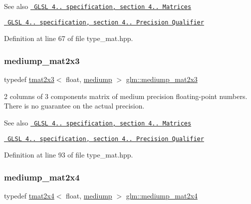 \begin{DoxySeeAlso}{See also}
\href{http://www.opengl.org/registry/doc/GLSLangSpec.4.20.8.pdf}{\texttt{ G\+L\+SL 4.. specification, section 4.. Matrices}} 

\href{http://www.opengl.org/registry/doc/GLSLangSpec.4.20.8.pdf}{\texttt{ G\+L\+SL 4.. specification, section 4.. Precision Qualifier}} 
\end{DoxySeeAlso}


Definition at line 67 of file type\+\_\+mat.\+hpp.

\mbox{\label{group__core__precision_ga39eba94b5dc46f46481c9c4428609731}} 
\subsubsection{\texorpdfstring{mediump\_mat2x3}{mediump\_mat2x3}}
{\footnotesize\ttfamily typedef \mbox{\hyperlink{structglm_1_1tmat2x3}{tmat2x3}}$<$ float, \mbox{\hyperlink{namespaceglm_a0f04f086094c747d227af4425893f545a6416f3ea0c9025fb21ed50c4d6620482}{mediump}} $>$ \mbox{\hyperlink{group__core__precision_ga39eba94b5dc46f46481c9c4428609731}{glm\+::mediump\+\_\+mat2x3}}}

2 columns of 3 components matrix of medium precision floating-\/point numbers. There is no guarantee on the actual precision.

\begin{DoxySeeAlso}{See also}
\href{http://www.opengl.org/registry/doc/GLSLangSpec.4.20.8.pdf}{\texttt{ G\+L\+SL 4.. specification, section 4.. Matrices}} 

\href{http://www.opengl.org/registry/doc/GLSLangSpec.4.20.8.pdf}{\texttt{ G\+L\+SL 4.. specification, section 4.. Precision Qualifier}} 
\end{DoxySeeAlso}


Definition at line 93 of file type\+\_\+mat.\+hpp.

\mbox{\label{group__core__precision_ga61617ba8393bbebc94ee813403aa54a9}} 
\subsubsection{\texorpdfstring{mediump\_mat2x4}{mediump\_mat2x4}}
{\footnotesize\ttfamily typedef \mbox{\hyperlink{structglm_1_1tmat2x4}{tmat2x4}}$<$ float, \mbox{\hyperlink{namespaceglm_a0f04f086094c747d227af4425893f545a6416f3ea0c9025fb21ed50c4d6620482}{mediump}} $>$ \mbox{\hyperlink{group__core__precision_ga61617ba8393bbebc94ee813403aa54a9}{glm\+::mediump\+\_\+mat2x4}}}

